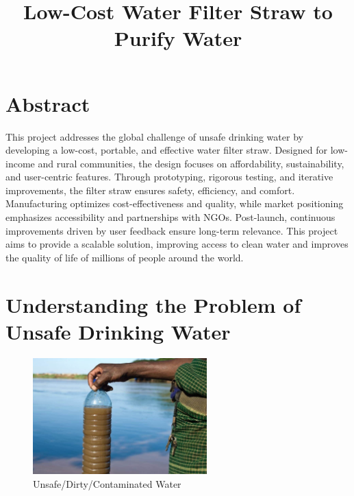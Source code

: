 \documentclass{article}
\title{Low-Cost Water Filter Straw to Purify Water}
\begin{document}
\maketitle

\section*{Abstract}
This project addresses the global challenge of unsafe drinking water by developing a low-cost, portable, and effective water filter straw. Designed for low-income and rural communities, the design focuses on affordability, sustainability, and user-centric features. Through prototyping, rigorous testing, and iterative improvements, the filter straw ensures safety, efficiency, and comfort. Manufacturing optimizes cost-effectiveness and quality, while market positioning emphasizes accessibility and partnerships with NGOs. Post-launch, continuous improvements driven by user feedback ensure long-term relevance. This project aims to provide a scalable solution, improving access to clean water and improves the quality of life of millions of people around the world.

\tableofcontents

\newpage

\section{Understanding the Problem of Unsafe Drinking Water}

\vspace{0.5cm} %

\begin{figure}[h!]
    \centering
    \includegraphics[width=0.6\textwidth]{dirtywater.jpg}
    \caption{Unsafe/Dirty/Contaminated Water}
    \label{fig:dirty_water}
\end{figure}

\vspace{0.5cm}
\vspace{0.3cm}
\end{document}
